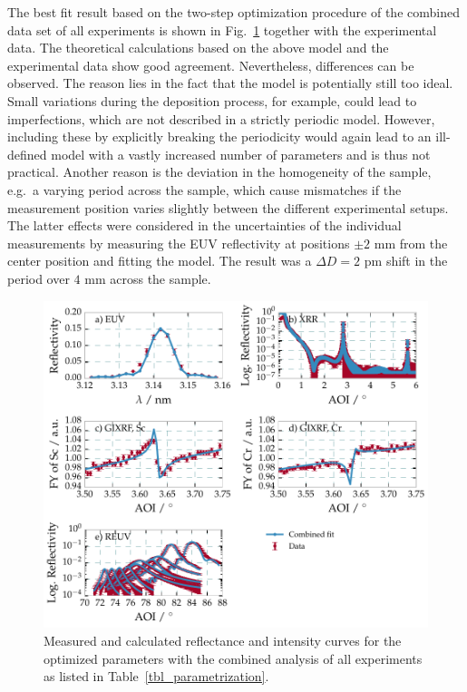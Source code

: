 The best fit result based on the two-step optimization procedure of the 
combined data set of all experiments is shown in 
Fig.~\ref{fig:combined_fit_result} together with the experimental data. The 
theoretical calculations based on the above model and the experimental data 
show good agreement. Nevertheless, differences can be observed. The reason lies 
in the fact that the model is potentially still too ideal. Small variations 
during the deposition process, for example, could lead to imperfections, which 
are not described in a strictly periodic model. However, including these by 
explicitly breaking the periodicity would again lead to an ill-defined model 
with a vastly increased number of parameters and is thus not practical. Another 
reason is the deviation in the homogeneity of the sample, e.g.~a varying period 
across the sample, which cause mismatches if the measurement position varies 
slightly between the different experimental setups. The latter effects were 
considered in the uncertainties of the individual measurements by measuring the 
EUV reflectivity at positions $\pm 2$ mm from the center position and fitting 
the model. The result was a $\Delta D = 2$ pm shift in the period over $4$ mm 
across the sample.
\onecolumn
\begin{figure}[htbp]
  \centering
  \includegraphics[width=\textwidth]{img/CrSc_combined_fit_result}
  \caption{Measured and calculated reflectance and intensity curves for the 
optimized parameters with the combined analysis of all experiments as listed in 
Table~\ref{tbl_parametrization}.}
  \label{fig:combined_fit_result}
\end{figure}
